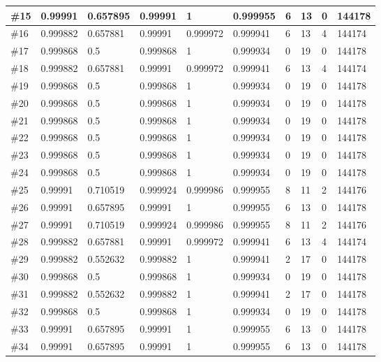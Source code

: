 \begin{longtable}{l|l|l|l|l|l|l|l|l|l}
\#15 & 0.99991  & 0.657895 & 0.99991  & 1        & 0.999955 & 6 & 13 & 0 & 144178 \\ \hline
\#16 & 0.999882 & 0.657881 & 0.99991  & 0.999972 & 0.999941 & 6 & 13 & 4 & 144174 \\ \hline
\#17 & 0.999868 & 0.5      & 0.999868 & 1        & 0.999934 & 0 & 19 & 0 & 144178 \\ \hline
\#18 & 0.999882 & 0.657881 & 0.99991  & 0.999972 & 0.999941 & 6 & 13 & 4 & 144174 \\ \hline
\#19 & 0.999868 & 0.5      & 0.999868 & 1        & 0.999934 & 0 & 19 & 0 & 144178 \\ \hline
\#20 & 0.999868 & 0.5      & 0.999868 & 1        & 0.999934 & 0 & 19 & 0 & 144178 \\ \hline
\#21 & 0.999868 & 0.5      & 0.999868 & 1        & 0.999934 & 0 & 19 & 0 & 144178 \\ \hline
\#22 & 0.999868 & 0.5      & 0.999868 & 1        & 0.999934 & 0 & 19 & 0 & 144178 \\ \hline
\#23 & 0.999868 & 0.5      & 0.999868 & 1        & 0.999934 & 0 & 19 & 0 & 144178 \\ \hline
\#24 & 0.999868 & 0.5      & 0.999868 & 1        & 0.999934 & 0 & 19 & 0 & 144178 \\ \hline
\#25 & 0.99991  & 0.710519 & 0.999924 & 0.999986 & 0.999955 & 8 & 11 & 2 & 144176 \\ \hline
\#26 & 0.99991  & 0.657895 & 0.99991  & 1        & 0.999955 & 6 & 13 & 0 & 144178 \\ \hline
\#27 & 0.99991  & 0.710519 & 0.999924 & 0.999986 & 0.999955 & 8 & 11 & 2 & 144176 \\ \hline
\#28 & 0.999882 & 0.657881 & 0.99991  & 0.999972 & 0.999941 & 6 & 13 & 4 & 144174 \\ \hline
\#29 & 0.999882 & 0.552632 & 0.999882 & 1        & 0.999941 & 2 & 17 & 0 & 144178 \\ \hline
\#30 & 0.999868 & 0.5      & 0.999868 & 1        & 0.999934 & 0 & 19 & 0 & 144178 \\ \hline
\#31 & 0.999882 & 0.552632 & 0.999882 & 1        & 0.999941 & 2 & 17 & 0 & 144178 \\ \hline
\#32 & 0.999868 & 0.5      & 0.999868 & 1        & 0.999934 & 0 & 19 & 0 & 144178 \\ \hline
\#33 & 0.99991  & 0.657895 & 0.99991  & 1        & 0.999955 & 6 & 13 & 0 & 144178 \\ \hline
\#34 & 0.99991  & 0.657895 & 0.99991  & 1        & 0.999955 & 6 & 13 & 0 & 144178 \\ \hline

\end{longtable}
